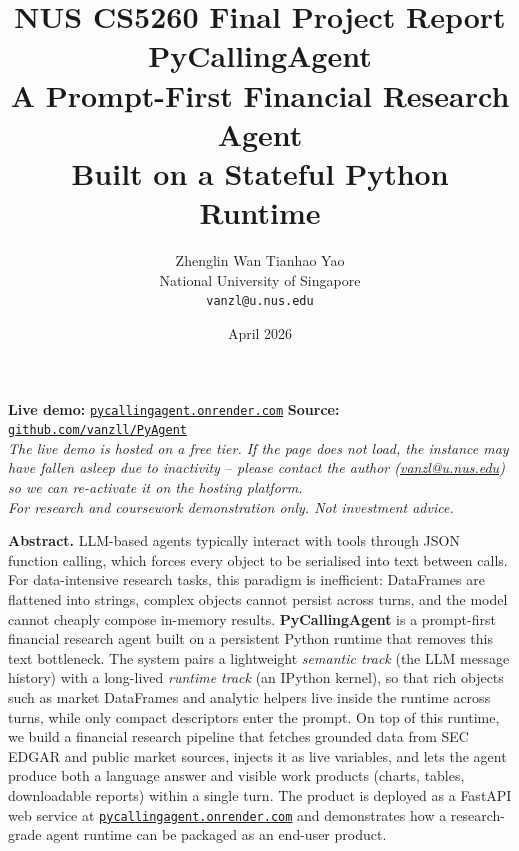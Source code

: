 \documentclass[11pt,a4paper]{article}
\title{%
  \vspace{-2em}
  \color{accent}\large NUS CS5260 \textendash{} Final Project Report\\[0.6em]
  \color{inkcolor}\Huge\bfseries PyCallingAgent\\[0.3em]
  \color{inkcolor}\large\mdseries A Prompt-First Financial Research Agent\\[-0.2em]
  \color{inkcolor}\large\mdseries Built on a Stateful Python Runtime
}
\author{%
  Zhenglin Wan \quad\textbar\quad Tianhao Yao\\
  \small National University of Singapore\\
  \small \texttt{vanzl@u.nus.edu}
}
\date{\small April 2026}
\begin{document}
\maketitle
\thispagestyle{fancy}

\begin{center}
\begin{minipage}{0.92\linewidth}
\centering
\color{mutedcolor}\small
\textbf{Live demo:} \href{https://pycallingagent.onrender.com}{\texttt{pycallingagent.onrender.com}} \quad\textbar\quad
\textbf{Source:} \href{https://github.com/vanzll/PyAgent}{\texttt{github.com/vanzll/PyAgent}}\\[0.4em]
\textit{\small The live demo is hosted on a free tier. If the page does not load, the instance may have fallen asleep due to inactivity -- please contact the author (\href{mailto:vanzl@u.nus.edu}{vanzl@u.nus.edu}) so we can re-activate it on the hosting platform.}\\[0.3em]
\textit{For research and coursework demonstration only. Not investment advice.}
\end{minipage}
\end{center}
\vspace{0.6em}

\noindent\textbf{\color{nusblue}Abstract.}\quad
LLM-based agents typically interact with tools through JSON function calling, which forces every object to be serialised into text between calls. For data-intensive research tasks, this paradigm is inefficient: DataFrames are flattened into strings, complex objects cannot persist across turns, and the model cannot cheaply compose in-memory results. \textbf{PyCallingAgent} is a prompt-first financial research agent built on a persistent Python runtime that removes this text bottleneck. The system pairs a lightweight \textit{semantic track} (the LLM message history) with a long-lived \textit{runtime track} (an IPython kernel), so that rich objects such as market DataFrames and analytic helpers live inside the runtime across turns, while only compact descriptors enter the prompt. On top of this runtime, we build a financial research pipeline that fetches grounded data from SEC EDGAR and public market sources, injects it as live variables, and lets the agent produce both a language answer and visible work products (charts, tables, downloadable reports) within a single turn. The product is deployed as a FastAPI web service at \href{https://pycallingagent.onrender.com}{\texttt{pycallingagent.onrender.com}} and demonstrates how a research-grade agent runtime can be packaged as an end-user product.
\end{document}
